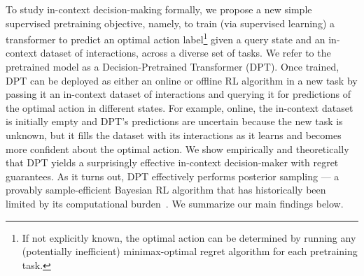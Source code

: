 To study in-context decision-making formally, we propose a new simple supervised pretraining objective, namely, to train (via supervised learning) a transformer to predict an optimal action label\footnote{If not explicitly known, the optimal action can be determined by running any (potentially inefficient) minimax-optimal regret algorithm for each pretraining task.} given a query state and an in-context dataset of interactions, across a diverse set of tasks. 
We refer to the pretrained model as a Decision-Pretrained Transformer (DPT). Once trained, DPT can be deployed as either an online or offline RL algorithm in a new task by passing it an in-context dataset of interactions and querying it for predictions of the optimal action in different states. For example, online, the in-context dataset is initially empty and DPT's predictions are uncertain because the new task is unknown, but it fills the dataset with its interactions as it learns and becomes more confident about the optimal action. We show empirically and theoretically that DPT yields a surprisingly effective in-context decision-maker with regret guarantees. As it turns out, DPT effectively performs posterior sampling --- a provably sample-efficient Bayesian RL algorithm that has historically been limited by its computational burden~\citep{osband2013more}. We summarize our main findings below.
